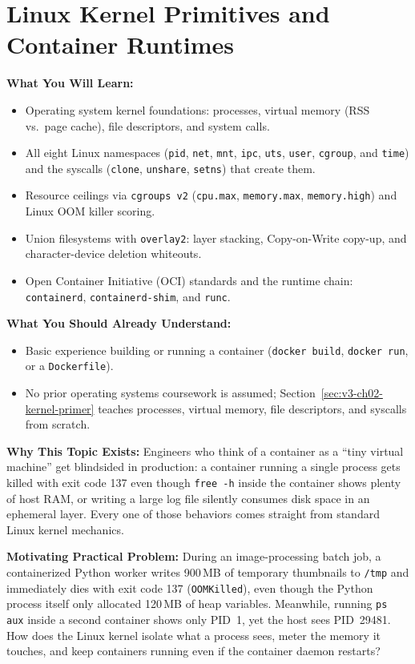 \chapter{Linux Kernel Primitives and Container Runtimes}
\label{chap:containers}

\begin{chaptergoalsbox}
\textbf{What You Will Learn:}
\begin{itemize}[leftmargin=12pt]
  \item Operating system kernel foundations: processes, virtual memory (RSS vs.\ page cache), file descriptors, and system calls.
  \item All eight Linux namespaces (\texttt{pid}, \texttt{net}, \texttt{mnt}, \texttt{ipc}, \texttt{uts}, \texttt{user}, \texttt{cgroup}, and \texttt{time}) and the syscalls (\texttt{clone}, \texttt{unshare}, \texttt{setns}) that create them.
  \item Resource ceilings via \texttt{cgroups v2} (\texttt{cpu.max}, \texttt{memory.max}, \texttt{memory.high}) and Linux OOM killer scoring.
  \item Union filesystems with \texttt{overlay2}: layer stacking, Copy-on-Write copy-up, and character-device deletion whiteouts.
  \item Open Container Initiative (OCI) standards and the runtime chain: \texttt{containerd}, \texttt{containerd-shim}, and \texttt{runc}.
\end{itemize}

\textbf{What You Should Already Understand:}
\begin{itemize}[leftmargin=12pt]
  \item Basic experience building or running a container (\texttt{docker build}, \texttt{docker run}, or a \texttt{Dockerfile}).
  \item No prior operating systems coursework is assumed; Section~\ref{sec:v3-ch02-kernel-primer} teaches processes, virtual memory, file descriptors, and syscalls from scratch.
\end{itemize}

\textbf{Why This Topic Exists:}
Engineers who think of a container as a ``tiny virtual machine'' get blindsided in production: a container running a single process gets killed with exit code 137 even though \texttt{free -h} inside the container shows plenty of host RAM, or writing a large log file silently consumes disk space in an ephemeral layer. Every one of those behaviors comes straight from standard Linux kernel mechanics.

\textbf{Motivating Practical Problem:}
During an image-processing batch job, a containerized Python worker writes 900\,MB of temporary thumbnails to \texttt{/tmp} and immediately dies with exit code 137 (\texttt{OOMKilled}), even though the Python process itself only allocated 120\,MB of heap variables. Meanwhile, running \texttt{ps aux} inside a second container shows only PID~1, yet the host sees PID~29481. How does the Linux kernel isolate what a process sees, meter the memory it touches, and keep containers running even if the container daemon restarts?
\end{chaptergoalsbox}

